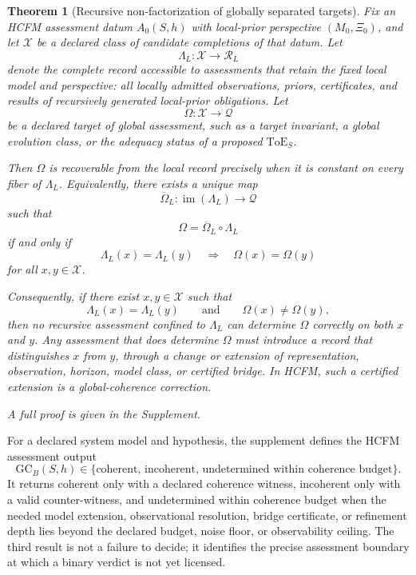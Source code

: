 \documentclass[11pt]{article}
\newtheorem{theorem}{Theorem}
\theoremstyle{definition}
\begin{document}
\begin{theorem}[Recursive non-factorization of globally separated targets]
\label{thm:recursive-non-factorization}
Fix an HCFM assessment datum $A_0(S,h)$ with local-prior perspective
$(M_0,\Xi_0)$, and let $\mathcal{X}$ be a declared class of candidate
completions of that datum. Let
\[
\Lambda_L : \mathcal{X} \longrightarrow \mathcal{R}_L
\]
denote the complete record accessible to assessments that retain the fixed
local model and perspective: all locally admitted observations, priors,
certificates, and results of recursively generated local-prior obligations.
Let
\[
\Omega : \mathcal{X} \longrightarrow \mathcal{Q}
\]
be a declared target of global assessment, such as a target invariant, a
global evolution class, or the adequacy status of a proposed
$\mathrm{ToE}_S$.

Then $\Omega$ is recoverable from the local record precisely when it is
constant on every fiber of $\Lambda_L$. Equivalently, there exists a unique
map
\[
\overline{\Omega}_L :
\operatorname{im}(\Lambda_L) \longrightarrow \mathcal{Q}
\]
such that
\[
\Omega = \overline{\Omega}_L \circ \Lambda_L
\]
if and only if
\[
\Lambda_L(x)=\Lambda_L(y)
\quad\Longrightarrow\quad
\Omega(x)=\Omega(y)
\]
for all $x,y\in\mathcal{X}$.

Consequently, if there exist $x,y\in\mathcal{X}$ such that
\[
\Lambda_L(x)=\Lambda_L(y)
\qquad\text{and}\qquad
\Omega(x)\neq\Omega(y),
\]
then no recursive assessment confined to $\Lambda_L$ can determine
$\Omega$ correctly on both $x$ and $y$. Any assessment that does determine
$\Omega$ must introduce a record that distinguishes $x$ from $y$, through a
change or extension of representation, observation, horizon, model class,
or certified bridge. In HCFM, such a certified extension is a
global-coherence correction.
\end{theorem}

\noindent\emph{A full proof is given in the Supplement.}

For a declared system model and hypothesis, the supplement defines the HCFM assessment output
\[
\mathrm{GC}_B(S, h) \in \{\text{coherent, incoherent, undetermined within coherence budget}\}.
\]
It returns coherent only with a declared coherence witness, incoherent only with a valid counter-witness, and undetermined within coherence budget when the needed model extension, observational resolution, bridge certificate, or refinement depth lies beyond the declared budget, noise floor, or observability ceiling. The third result is not a failure to decide; it identifies the precise assessment boundary at which a binary verdict is not yet licensed.
\end{document}
